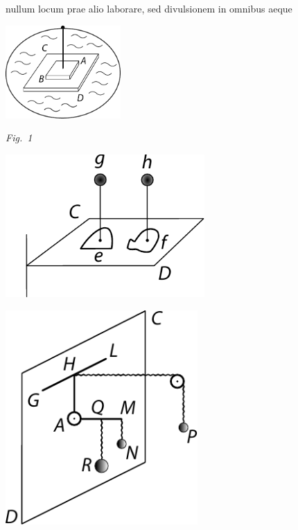 %
nullum\hspace{0.3mm} locum\hspace{0.3mm} prae\hspace{0.2mm} alio\hspace{0.2mm} laborare,\hspace{0.2mm} sed\hspace{0.2mm} divulsionem\protect{}\hspace{0.2mm} in\hspace{0.2mm} omnibus\hspace{0.2mm} aeque
\pend
 \vspace{1.2em}%
  \centerline{\includegraphics[width=0.33\textwidth]{gesamttex/edit_VIII,3/images/LH_37_03_069-070_d01.pdf}}%
  \vspace{0.5em}
  \centerline{\lbrack\textit{Fig.~1}\rbrack}\label{LH_37_03_069r_Fig.1}%
\newpage
\pstart
\hspace{5mm}\begin{minipage}[t]{0.5\textwidth}
\includegraphics[width=0.57\textwidth]{gesamttex/edit_VIII,3/images/LH_37_03_069-070_d02.pdf}
\end{minipage}
\hspace{0mm}
\begin{minipage}[t]{0.5\textwidth}
\includegraphics[width=0.55\textwidth]{gesamttex/edit_VIII,3/images/LH_37_03_069-070_d03.pdf}
\end{minipage}
